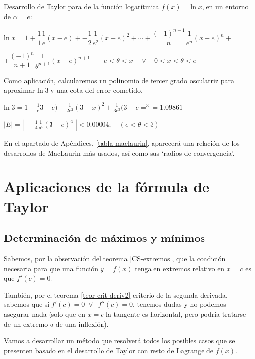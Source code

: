 	\begin{ejem}Desarrollo de Taylor para de la función logarítmica  $f(x)=\mathrm{ln}\;x$, en un entorno de $\alpha=e$:
	
	$\mathrm{ln}\; x = 1 + \dfrac 1 1 \dfrac 1 e (x-e) +- \dfrac 1 2 \dfrac 1 {e^2} (x-e)^2 + \cdots + \dfrac {(-1)^{n-1}}{n} \dfrac 1 {e^n} (x-e)^n + $
	
	$ + \dfrac {(-1)^n}{n+1} \dfrac 1 {\theta ^{n+1}} (x-e)^{n+1} \qquad e < \theta < x \quad \vee \quad 0 < x < \theta < e$
	
	Como aplicación, calcularemos un polinomio de tercer grado osculatriz para aproximar $\mathrm{ln}\; 3$ y una cota del error cometido.
	
	$\mathrm{ln}\; 3 = 1+ \frac 1 e 3-e)- \frac 1 {2e^2}(3-x)^2+ \frac 1 {3e^3}(3-e=^3 = 1.09861$
	
	$|E|=|\; - \frac 1 4 \frac 1 {\theta^4} (3-e)^4  \;| < 0.00004; \quad (e<\theta<3) \;$
		
	\end{ejem}
	
	En el apartado de Apéndices, \ref{tabla-maclaurin},  aparecerá una relación de los desarrollos de MacLaurin más usados, así como sus `radios de convergencia'.
	
	\section{Aplicaciones de la fórmula de Taylor}
	
	\subsection{Determinación de máximos y mínimos}
	
	Sabemos, por la observación del teorema \ref{CS-extremos}, que la condición necesaria para que una función $y=f(x)$ tenga en extremos relativo en $x=c$ es que $f'(c)=0$. 
	 
	 También, por el teorema \ref{teor-crit-deriv2} criterio de la segunda derivada, sabemos que si $f'(c)=0\; \vee \ \; f''(c)=0$, tenemos dudas y no podemos asegurar nada (solo que en $x=c$ la tangente es horizontal, pero podría tratarse de un extremo o de una inflexión).
	 
	 Vamos a desarrollar un método que resolverá todos los posibles casos que se presenten basado en el desarrollo de Taylor con resto de Lagrange de $f(x)$.
	 
	 \vspace{2mm}
	 
